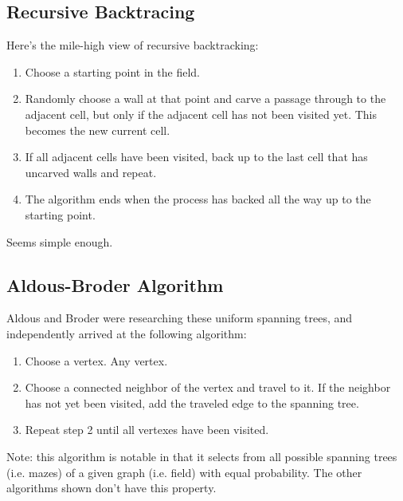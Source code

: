 \documentclass{article}
\begin{document}
\subsection{Recursive Backtracing}
Here's the mile-high view of recursive backtracking:
\begin{enumerate}
    \item Choose a starting point in the field.
    \item Randomly choose a wall at that point and carve a passage through to the adjacent cell, but only if the adjacent cell has not been visited yet. This becomes the new current cell.
    \item If all adjacent cells have been visited, back up to the last cell that has uncarved walls and repeat.
    \item The algorithm ends when the process has backed all the way up to the starting point.
\end{enumerate}

Seems simple enough.

\subsection{Aldous-Broder Algorithm}
Aldous and Broder were researching these uniform spanning trees, and independently arrived at the following algorithm:
\begin{enumerate}
    \item Choose a vertex. Any vertex.
    \item Choose a connected neighbor of the vertex and travel to it. If the neighbor has not yet been visited, add the traveled edge to the spanning tree.
    \item Repeat step 2 until all vertexes have been visited.
\end{enumerate}

Note: this algorithm is notable in that it selects from all possible spanning trees (i.e. mazes) of a given graph (i.e. field) with equal probability. The other algorithms shown don't have this property.
\end{document}
